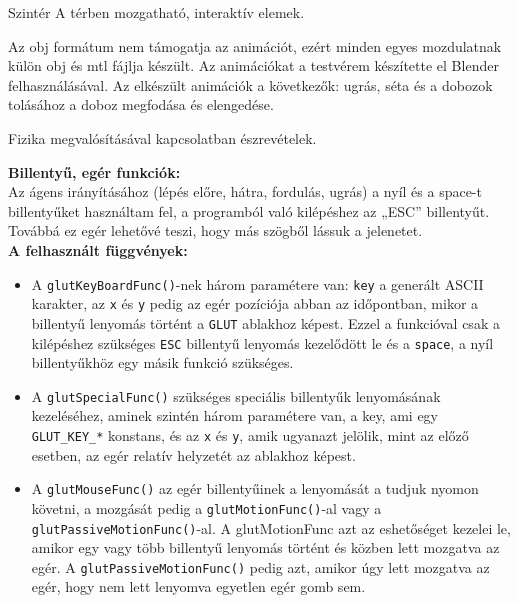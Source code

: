 
Szintér
A térben mozgatható, interaktív elemek.

Az obj formátum nem támogatja az animációt, ezért minden egyes mozdulatnak külön obj és mtl fájlja készült.
Az animációkat a testvérem készítette el Blender felhasználásával. Az elkészült animációk a következők:
ugrás, séta és a dobozok tolásához a doboz megfodása és elengedése.
 
Fizika megvalósításával kapcsolatban észrevételek.


{\bf Billentyű, egér funkciók:}\\

Az ágens irányításához (lépés előre, hátra, fordulás, ugrás) a nyíl és a space-t billentyűket használtam fel, a  programból való kilépéshez az „ESC” billentyűt. Továbbá ez egér lehetővé teszi, hogy más szögből lássuk a jelenetet.\\

{ \bf A felhasznált függvények:}

\begin{itemize}
\item A \texttt{glutKeyBoardFunc()}-nek három paramétere van: \texttt{key} a generált ASCII karakter, az \texttt{x} és \texttt{y} pedig az egér pozíciója abban az időpontban, mikor a billentyű lenyomás történt a \texttt{GLUT} ablakhoz képest. Ezzel a funkcióval csak a kilépéshez szükséges \texttt{ESC} billentyű lenyomás kezelődött le és a \texttt{space}, a nyíl billentyűkhöz egy másik funkció szükséges.
\item A \texttt{glutSpecialFunc()} szükséges speciális billentyűk lenyomásának kezeléséhez,  
aminek szintén három paramétere van, a key, ami egy \texttt{GLUT\_KEY\_*} konstans, és az \texttt{x} és \texttt{y}, amik ugyanazt jelölik, mint az előző esetben, az egér relatív helyzetét az ablakhoz képest.
\item A \texttt{glutMouseFunc()} az egér billentyűinek a lenyomását a  tudjuk nyomon követni, a mozgását pedig a \texttt{glutMotionFunc()}-al vagy a \texttt{glutPassiveMotionFunc()}-al. A glutMotionFunc azt az eshetőséget kezelei le, amikor egy vagy több billentyű lenyomás történt és közben lett mozgatva az egér. A \texttt{glutPassiveMotionFunc()} pedig azt, amikor úgy lett mozgatva az egér, hogy nem lett lenyomva egyetlen egér gomb sem.  
\end{itemize}

